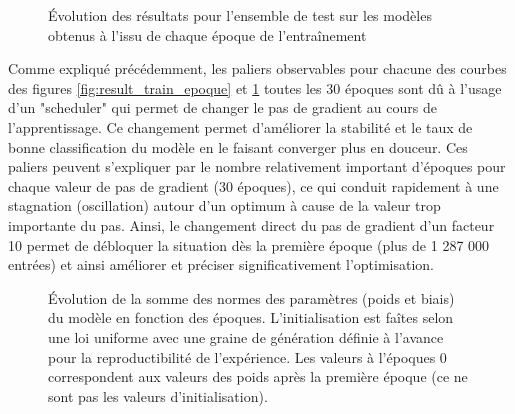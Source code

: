 \documentclass[12pt,english, openany]{book}
\begin{document}
\begin{figure}[H]
\centering
  \hfill
  \hfill
  \caption{Évolution des résultats pour l'ensemble de test sur les modèles obtenus à l'issu de chaque époque de l'entraînement}
  \label{fig:result_test_epoque}
\end{figure}

Comme expliqué précédemment, les paliers observables pour chacune des courbes des figures \ref{fig:result_train_epoque} et \ref{fig:result_test_epoque} toutes les 30 époques sont dû à l'usage d'un "scheduler" qui permet de changer le pas de gradient au cours de l'apprentissage. Ce changement permet d'améliorer la stabilité et le taux de bonne classification du modèle en le faisant converger plus en douceur. Ces paliers peuvent s'expliquer par le nombre relativement important d'époques pour chaque valeur de pas de gradient (30 époques), ce qui conduit rapidement à une stagnation (oscillation) autour d'un optimum à cause de la valeur trop importante du pas. Ainsi, le changement direct du pas de gradient d'un facteur 10 permet de débloquer la situation dès la première époque (plus de 1 287 000 entrées) et ainsi améliorer et préciser significativement l'optimisation. \\

\begin{figure}[H]
\centering
  \hfill
  \caption{Évolution de la somme des normes des paramètres (poids et biais) du modèle en fonction des époques. L'initialisation est faîtes selon une loi uniforme avec une graine de génération définie à l'avance pour la reproductibilité de l'expérience. Les valeurs à l'époques 0 correspondent aux valeurs des poids après la première époque (ce ne sont pas les valeurs d'initialisation).}
  \label{fig:result_weights}
\end{figure}
\end{document}
